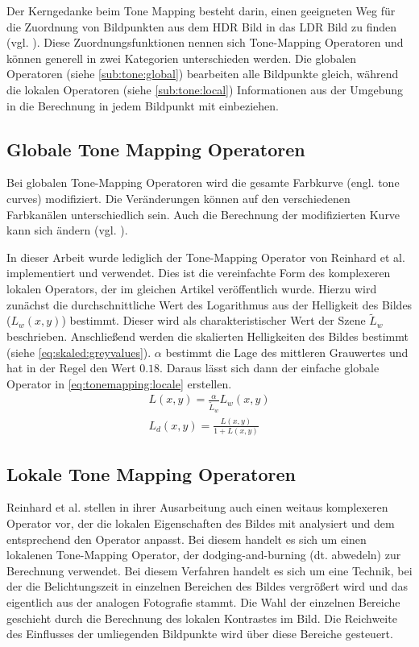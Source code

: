 Der Kerngedanke beim Tone Mapping besteht darin, einen geeigneten Weg für die Zuordnung von Bildpunkten aus dem \gls{HDR} Bild in das \gls{LDR} Bild zu finden (vgl. \cite[S. 145]{Bloch2012}). Diese Zuordnungsfunktionen nennen sich \gls{Tone-Mapping} Operatoren und können generell in zwei Kategorien unterschieden werden. Die globalen Operatoren (siehe \autoref{sub:tone:global}) bearbeiten alle Bildpunkte gleich, während die lokalen Operatoren (siehe \autoref{sub:tone:local}) Informationen aus der Umgebung in die Berechnung in jedem Bildpunkt mit einbeziehen.
 

 \subsection{Globale Tone Mapping Operatoren}
\label{sub:tone:global}
Bei globalen \gls{Tone-Mapping} Operatoren wird die gesamte Farbkurve (engl. tone curves) modifiziert. Die Veränderungen können auf den verschiedenen Farbkanälen unterschiedlich sein. Auch die Berechnung der modifizierten Kurve kann sich ändern (vgl. \cite[S. 146]{Bloch2012}).

In dieser Arbeit wurde lediglich der \gls{Tone-Mapping} Operator von Reinhard et al. \cite{ReinhardToneMapper} implementiert und verwendet. Dies ist die vereinfachte Form des komplexeren lokalen Operators, der im gleichen Artikel veröffentlich wurde.
Hierzu wird zunächst die durchschnittliche Wert des Logarithmus aus der Helligkeit des Bildes ($L_w(x,y)$) bestimmt. Dieser wird als charakteristischer Wert der Szene $\tilde{L}_w$ beschrieben. Anschließend werden die skalierten Helligkeiten des Bildes bestimmt (siehe \autoref{eq:skaled:greyvalues}). $\alpha$ bestimmt die Lage des mittleren Grauwertes und hat in der Regel den Wert $0.18$. Daraus lässt sich dann der einfache globale Operator in \autoref{eq:tonemapping:locale} erstellen.
\begin{align}
\label{eq:skaled:greyvalues}
L(x,y) = \frac{\alpha}{\tilde{L}_w} L_w(x,y)\\
\label{eq:tonemapping:global}
L_d(x, y) =\frac{L(x,y)}{1+ L(x,y)}
\end{align}


\subsection{Lokale Tone Mapping Operatoren}
\label{sub:tone:local}

Reinhard et al. \cite{ReinhardToneMapper} stellen in ihrer Ausarbeitung auch einen weitaus komplexeren Operator vor, der die lokalen Eigenschaften des Bildes mit analysiert und dem entsprechend den Operator anpasst. Bei diesem handelt es sich um einen lokalenen \gls{Tone-Mapping} Operator, der dodging-and-burning (dt. abwedeln) zur Berechnung verwendet. Bei diesem Verfahren handelt es sich um eine Technik, bei der die Belichtungszeit in einzelnen Bereichen des Bildes vergrößert wird und das eigentlich aus der analogen Fotografie stammt. Die Wahl der einzelnen Bereiche geschieht durch die Berechnung des lokalen Kontrastes im Bild. Die Reichweite des Einflusses der umliegenden Bildpunkte wird über diese Bereiche gesteuert.

